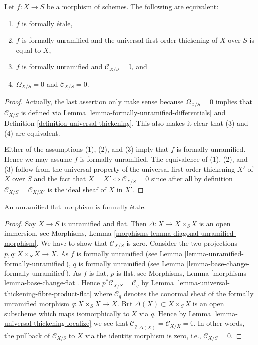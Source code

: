 \begin{lemma}
\label{lemma-characterize-formally-etale}
Let $f : X \to S$ be a morphism of schemes.
The following are equivalent:
\begin{enumerate}
\item $f$ is formally \'etale,
\item $f$ is formally unramified and the universal first order thickening
of $X$ over $S$ is equal to $X$,
\item $f$ is formally unramified and $\mathcal{C}_{X/S} = 0$, and
\item $\Omega_{X/S} = 0$ and $\mathcal{C}_{X/S} = 0$.
\end{enumerate}
\end{lemma}

\begin{proof}
Actually, the last assertion only make sense because $\Omega_{X/S} = 0$
implies that $\mathcal{C}_{X/S}$ is defined via
Lemma \ref{lemma-formally-unramified-differentials}
and
Definition \ref{definition-universal-thickening}.
This also makes it clear that (3) and (4) are equivalent.

\medskip\noindent
Either of the assumptions (1), (2), and (3) imply that $f$ is formally
unramified. Hence we may assume $f$ is formally unramified. The equivalence
of (1), (2), and (3) follow from the universal property of the universal
first order thickening $X'$ of $X$ over $S$ and the fact that
$X = X' \Leftrightarrow \mathcal{C}_{X/S} = 0$ since
after all by definition $\mathcal{C}_{X/S} = \mathcal{C}_{X/X'}$
is the ideal sheaf of $X$ in $X'$.
\end{proof}

\begin{lemma}
\label{lemma-unramified-flat-formally-etale}
An unramified flat morphism is formally \'etale.
\end{lemma}

\begin{proof}
Say $X \to S$ is unramified and flat. Then $\Delta : X \to X \times_S X$
is an open immersion, see
Morphisms, Lemma \ref{morphisms-lemma-diagonal-unramified-morphism}.
We have to show that $\mathcal{C}_{X/S}$ is zero.
Consider the two projections $p, q : X \times_S X \to X$.
As $f$ is formally unramified (see
Lemma \ref{lemma-unramified-formally-unramified}),
$q$ is formally unramified (see
Lemma \ref{lemma-base-change-formally-unramified}).
As $f$ is flat, $p$ is flat, see
Morphisms, Lemma \ref{morphisms-lemma-base-change-flat}.
Hence $p^*\mathcal{C}_{X/S} = \mathcal{C}_q$ by
Lemma \ref{lemma-universal-thickening-fibre-product-flat}
where $\mathcal{C}_q$ denotes the conormal sheaf of the formally
unramified morphism $q : X \times_S X \to X$.
But $\Delta(X) \subset X \times_S X$ is an open subscheme
which maps isomorphically to $X$ via $q$. Hence by
Lemma \ref{lemma-universal-thickening-localize}
we see that $\mathcal{C}_q|_{\Delta(X)} = \mathcal{C}_{X/X} = 0$.
In other words, the pullback of $\mathcal{C}_{X/S}$ to $X$ via
the identity morphism is zero, i.e., $\mathcal{C}_{X/S} = 0$.
\end{proof}

